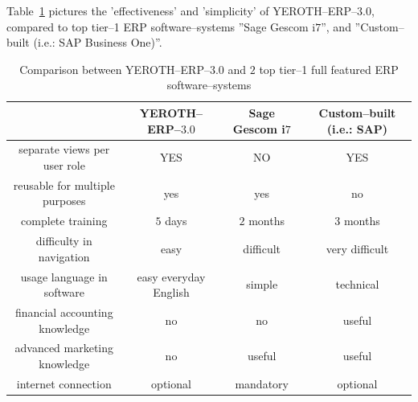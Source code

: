 \documentclass[12pt, a4paper]{article}
\newcommand{\yerotherpblack}{YEROTH--ERP--$3.0$\xspace}
\newcommand{\erpcustombuiltIESAPone}{Custom--built (i.e.: SAP Business One)\xspace}
\newcommand{\erpcustombuiltIESAP}{Custom--built (i.e.: SAP)\xspace}
\newcommand{\sageerp}{Sage Gescom i$7$\xspace}
\newcommand{\yerothvert}[1]{\textcolor{yerothColorGreen}{#1}\xspace}
\newcommand{\yerothorange}[1]{\textcolor{yerothColorOrange}{#1}\xspace}
\newcommand{\yerothrouge}[1]{\textcolor{yerothColorRed}{#1}\xspace}
\newcommand{\yerothfacile}{\yerothvert{easy}\xspace}
\newcommand{\yerothdifficile}{\yerothorange{difficult}\xspace}
\newcommand{\yerothtresdifficile}{\yerothrouge{very difficult}\xspace}
\begin{document}
\vspace{0em}

Table~\ref{tab:comparison-against-others-erp-software-systems}
pictures the 'effectiveness' and 'simplicity' of \yerotherpblack, 
compared to top tier--1 ERP software--systems ''\sageerp'',
and ''\erpcustombuiltIESAPone''.\\

\vspace{-1.2em}

\begin{table}[!htbp]
\centering
\begin{tabular}{cccc} 

\multicolumn{1}{c}{}			&
\yerotherpblack 				& 
\sageerp						&
\erpcustombuiltIESAP 			\\ \hline

separate views per user role	&
		\yerothvert{YES}		&
		\yerothrouge{NO}		&
		\yerothvert{YES}		\\ \hline

reusable for multiple purposes	&
		\yerothvert{yes}		&
		\yerothvert{yes}		&	
		\yerothrouge{no}		\\ \hline

complete training					&
		\yerothvert{$5$ days}		&
		\yerothorange{$2$ months}	&	
		\yerothrouge{$3$ months}	\\ \hline

difficulty in navigation			&
		\yerothfacile				&
		\yerothdifficile			&
		\yerothtresdifficile		\\  \hline
		
usage language in software					&
		\yerothvert{easy everyday English}	&
		\yerothorange{simple}				&
		\yerothrouge{technical}				\\ \hline			
		
financial accounting knowledge	&
		\yerothvert{no}			&
		\yerothvert{no}			&
		\yerothorange{useful}	\\ \hline		

advanced marketing knowledge	&
		\yerothvert{no}			&
		\yerothorange{useful}	&
		\yerothorange{useful}	\\ \hline
		
internet connection				&
		\yerothvert{optional}	&
		\yerothrouge{mandatory}	&
		\yerothvert{optional}	\\ 
\end{tabular}
\caption{Comparison between \yerotherpblack and $2$ top tier--1
	full featured ERP software--systems\\}
\label{tab:comparison-against-others-erp-software-systems}
\end{table}
\end{document}
